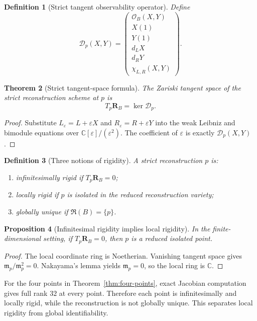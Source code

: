 \documentclass[11pt]{amsart}
\newtheorem{theorem}{Theorem}[section]
\newtheorem{proposition}[theorem]{Proposition}
\newtheorem{definition}[theorem]{Definition}
\newcommand{\Rfib}{\mathfrak R}
\newcommand{\cO}{\mathcal O}
\newcommand{\cD}{\mathscr D}
\newcommand{\C}{\mathbb C}
\begin{document}
\begin{definition}[Strict tangent observability operator]
Define
\[
\cD_p(X,Y)=
\begin{pmatrix}
\cO_B(X,Y)\\
X(1)\\
Y(1)\\
d_LX\\
d_RY\\
\chi_{L,R}(X,Y)
\end{pmatrix}.
\]
\end{definition}

\begin{theorem}[Strict tangent-space formula]\label{thm:tangent-formula}
The Zariski tangent space of the strict reconstruction scheme at $p$ is
\[
T_p\mathbf R_B=\ker\cD_p.
\]
\end{theorem}

\begin{proof}
Substitute $L_\varepsilon=L+\varepsilon X$ and $R_\varepsilon=R+\varepsilon Y$ into the weak Leibniz and bimodule equations over $\C[\varepsilon]/(\varepsilon^2)$.  The coefficient of $\varepsilon$ is exactly $\cD_p(X,Y)$.
\end{proof}

\begin{definition}[Three notions of rigidity]
A strict reconstruction $p$ is:
\begin{enumerate}[label=(\roman*)]
\item \emph{infinitesimally rigid} if $T_p\mathbf R_B=0$;
\item \emph{locally rigid} if $p$ is isolated in the reduced reconstruction variety;
\item \emph{globally unique} if $\Rfib(B)=\{p\}$.
\end{enumerate}
\end{definition}

\begin{proposition}[Infinitesimal rigidity implies local rigidity]\label{prop:inf-local}
In the finite-dimensional setting, if $T_p\mathbf R_B=0$, then $p$ is a reduced isolated point.
\end{proposition}

\begin{proof}
The local coordinate ring is Noetherian.  Vanishing tangent space gives $\mathfrak m_p/\mathfrak m_p^2=0$.  Nakayama's lemma yields $\mathfrak m_p=0$, so the local ring is $\C$.
\end{proof}

For the four points in Theorem~\ref{thm:four-points}, exact Jacobian computation gives full rank $32$ at every point.  Therefore each point is infinitesimally and locally rigid, while the reconstruction is not globally unique.  This separates local rigidity from global identifiability.
\end{document}
